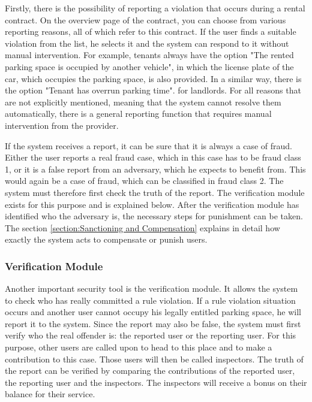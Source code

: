 \documentclass[
a4paper,     %
titlepage,   %
14pt         %
]{scrartcl}  %
\theoremstyle{mystyle}
\begin{document}
Firstly, there is the possibility of reporting a violation that occurs during a rental contract. On the overview page of the contract, you can choose from various reporting reasons, all of which refer to this contract. If the user finds a suitable violation from the list, he selects it and the system can respond to it without manual intervention. For example, tenants always have the option "The rented parking space is occupied by another vehicle", in which the license plate of the car, which occupies the parking space, is also provided. In a similar way, there is the option "Tenant has overrun parking time". for landlords. For all reasons that are not explicitly mentioned, meaning that the system cannot resolve them automatically, there is a general reporting function that requires manual intervention from the provider.

If the system receives a report, it can be sure that it is always a case of fraud. Either the user reports a real fraud case, which in this case has to be fraud class 1, or it is a false report from an adversary, which he expects to benefit from. This would again be a case of fraud, which can be classified in fraud class 2. The system must therefore first check the truth of the report. The verification module exists for this purpose and is explained below. After the verification module has identified who the adversary is, the necessary steps for punishment can be taken. The section \ref{section:Sanctioning and Compensation}  explains in detail how exactly the system acts to compensate or punish users.

\subsubsection{Verification Module}\label{section:Verification Module} Another important security tool is the verification module. It allows the system to check who has really committed a rule violation. If a rule violation situation occurs and another user cannot occupy his legally entitled parking space, he will report it to the system. Since the report may also be false, the system must first verify who the real offender is: the reported user or the reporting user. For this purpose, other users are called upon to head to this place and to make a contribution to this case. Those users will then be called inspectors. The truth of the report can be verified by comparing the contributions of the reported user, the reporting user and the inspectors. The inspectors will receive a bonus on their balance for their service.
\end{document}
